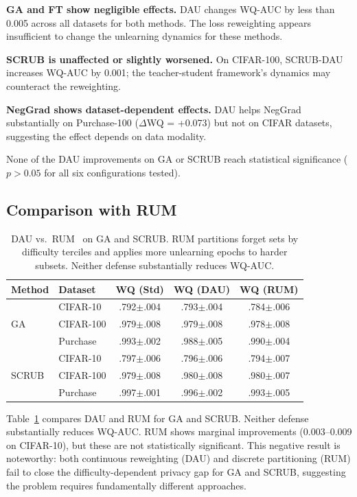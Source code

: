 \documentclass{article}
\begin{document}
\textbf{GA and FT show negligible effects.}
DAU changes WQ-AUC by less than 0.005 across all datasets for both methods.
The loss reweighting appears insufficient to change the unlearning dynamics for these methods.

\textbf{SCRUB is unaffected or slightly worsened.}
On CIFAR-100, SCRUB-DAU increases WQ-AUC by 0.001; the teacher-student framework's dynamics may counteract the reweighting.

\textbf{NegGrad shows dataset-dependent effects.}
DAU helps NegGrad substantially on Purchase-100 ($\Delta$WQ = +0.073) but not on CIFAR datasets, suggesting the effect depends on data modality.

None of the DAU improvements on GA or SCRUB reach statistical significance ($p > 0.05$ for all six configurations tested).

\subsection{Comparison with RUM}

\begin{table}[t]
\caption{DAU vs.\ RUM~\citep{zhao2024what} on GA and SCRUB. RUM partitions forget sets by difficulty terciles and applies more unlearning epochs to harder subsets. Neither defense substantially reduces WQ-AUC.}
\label{tab:rum}
\centering
\small
\begin{tabular}{ll ccc}
\toprule
Method & Dataset & WQ (Std) & WQ (DAU) & WQ (RUM) \\
\midrule
\multirow{3}{*}{GA} & CIFAR-10 & .792$\pm$.004 & .793$\pm$.004 & .784$\pm$.006 \\
& CIFAR-100 & .979$\pm$.008 & .979$\pm$.008 & .978$\pm$.008 \\
& Purchase & .993$\pm$.002 & .988$\pm$.005 & .990$\pm$.004 \\
\midrule
\multirow{3}{*}{SCRUB} & CIFAR-10 & .797$\pm$.006 & .796$\pm$.006 & .794$\pm$.007 \\
& CIFAR-100 & .979$\pm$.008 & .980$\pm$.008 & .980$\pm$.007 \\
& Purchase & .997$\pm$.001 & .996$\pm$.002 & .993$\pm$.005 \\
\bottomrule
\end{tabular}
\end{table}

Table~\ref{tab:rum} compares DAU and RUM for GA and SCRUB.
Neither defense substantially reduces WQ-AUC.
RUM shows marginal improvements (0.003--0.009 on CIFAR-10), but these are not statistically significant.
This negative result is noteworthy: both continuous reweighting (DAU) and discrete partitioning (RUM) fail to close the difficulty-dependent privacy gap for GA and SCRUB, suggesting the problem requires fundamentally different approaches.
\end{document}
